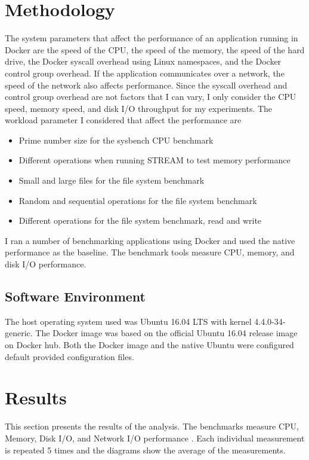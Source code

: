 \documentclass[11pt]{article}
\begin{document}
\section{Methodology}
The system parameters that affect the performance of an application running in Docker are the speed of the CPU, the speed of the memory, the speed of the hard drive, the Docker syscall overhead using Linux namespaces, and the Docker control group overhead. If the application communicates over a network, the speed of the network also affects performance. Since the syscall overhead and control group overhead are not factors that I can vary, I only consider the CPU speed, memory speed, and disk I/O throughput for my experiments. The workload parameter I considered that affect the performance are 
\begin{itemize}
\item Prime number size for the sysbench CPU benchmark
\item Different operations when running STREAM to test memory performance
\item Small and large files for the file system benchmark
\item Random and sequential operations for the file system benchmark
\item Different operations for the file system benchmark, read and write
\end{itemize}
I ran a number of benchmarking applications using Docker and used the native performance as the baseline. The benchmark tools measure CPU, memory, and disk I/O performance. 

\subsection{Software Environment}
The host operating system used was Ubuntu 16.04 LTS with kernel 4.4.0-34-generic. 
The Docker image was based on the official Ubuntu 16.04 release image on Docker hub. 
Both the Docker image and the native Ubuntu were configured default provided configuration files. 


\section{Results}
This section presents the results of the analysis. The benchmarks measure CPU, Memory, Disk I/O, and Network I/O performance \cite{bukh}. Each individual measurement is repeated 5 
times and the diagrams show the average of the measurements. 
\end{document}
